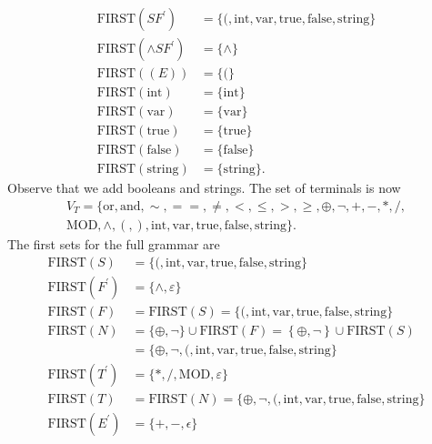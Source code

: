 \documentclass{report}
\begin{document}
\begin{itemize}
\begin{align*}
                \text{FIRST}(SF^{\prime}) &= \{(, \text{int}, \text{var}, \text{true}, \text{false}, \text{string}\}\\
                \text{FIRST}(\land SF^{\prime}) &= \{\land\}\\
                \text{FIRST}((E)) &= \{(\}\\
                \text{FIRST}(\text{int}) &= \{\text{int}\}\\
                \text{FIRST}(\text{var}) &= \{\text{var}\} \\
                \text{FIRST}(\text{true}) &= \{\text{true}\} \\
                \text{FIRST}(\text{false}) &= \{\text{false}\} \\
                \text{FIRST}(\text{string}) &= \{\text{string}\}
            .\end{align*}
            Observe that we add booleans and strings. The set of terminals is now 
            \begin{align*}
                V_{T} = \{\text{or}, \text{and}, \sim, ==, \ne, <, \leq, >, \geq, \oplus, \neg, +, -, *, /, \\
                    \text{MOD}, \land, (, ), \text{int}, \text{var}, \text{true}, \text{false}, \text{string}\}
            .\end{align*}
            The first sets for the full grammar are
            \begin{align*}
                \text{FIRST}(S) &= \{(,\text{int}, \text{var}, \text{true}, \text{false}, \text{string}\} \\
                \text{FIRST}(F^{\prime}) &= \{\land, \varepsilon\} \\
                \text{FIRST}(F) &=  \text{FIRST}(S) = \{(, \text{int}, \text{var}, \text{true}, \text{false}, \text{string}\} \\
                \text{FIRST}(N) &= \{\oplus,\neg\} \cup \text{FIRST}(F) = \left\{\oplus, \neg\right\} \cup \text{FIRST}(S) \\
                                &= \{\oplus,\neg,(,\text{int}, \text{var}, \text{true}, \text{false}, \text{string}\} \\
                \text{FIRST}(T^{\prime}) &= \{*, /, \text{MOD}, \varepsilon\} \\
                \text{FIRST}(T) &= \text{FIRST}(N) = \{\oplus,\neg,(,\text{int}, \text{var}, \text{true}, \text{false}, \text{string}\} \\
                \text{FIRST}(E^{\prime}) &= \{+,-,\epsilon\} \\

\end{align*}
\end{itemize}
\end{document}
